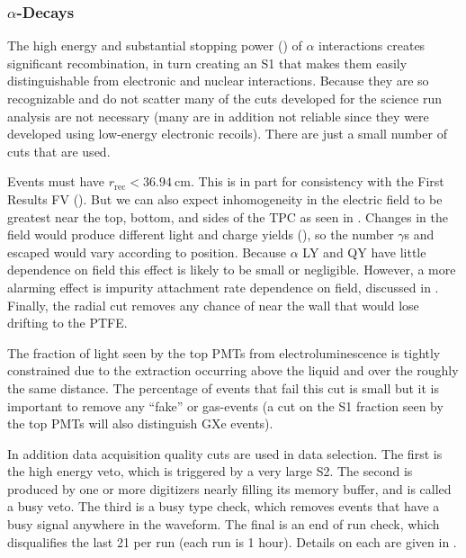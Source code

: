 \subsubsection{$\alpha$-Decays}
\label{subsubsec:electron_lifetimes_measurement_alphas}
The high energy and substantial stopping power () of $\alpha$ interactions creates significant
recombination, in turn creating an S1 that makes them easily distinguishable from electronic and nuclear
interactions.  Because they are so recognizable and do not scatter many of the cuts developed for the science run analysis are not
necessary (many are in addition not reliable since they were developed using low-energy electronic recoils).  There are just a small
number of cuts that are used.

Events must have $r_{\mathrm{rec}} < 36.94\ \mathrm{cm}$.  This is in part for consistency with the First Results FV
().  But we can also expect inhomogeneity in the electric field to be greatest near the top, bottom, and sides of the
TPC as seen in .  Changes in the field would produce different light and charge yields
(), so the number $\gamma$s and escaped \electron would vary according to position.  Because $\alpha$
LY and QY have little dependence on field this effect is likely to be small or negligible.  However, a more alarming effect is impurity
attachment rate dependence on field, discussed in .  Finally, the radial cut removes any
chance of \alphadecays near the wall that would lose drifting \electron to the PTFE.

The fraction of light seen by the top PMTs from electroluminescence is tightly constrained due to the extraction occurring above the
liquid and over the roughly the same distance.  The percentage of events that fail this cut is small but it is important to remove any
``fake'' or gas-events (a cut on the S1 fraction seen by the top PMTs will also distinguish GXe events).

In addition data acquisition quality cuts are used in data selection.  The first is the high energy veto, which is triggered by a very
large S2.  The second is produced by one or more digitizers nearly filling its memory buffer, and is called a busy veto.  The third is
a busy type check, which removes events that have a busy signal anywhere in the waveform.  The final is an end of run check, which
disqualifies the last 21 per run (each run is 1 hour).  Details on each are given in .

